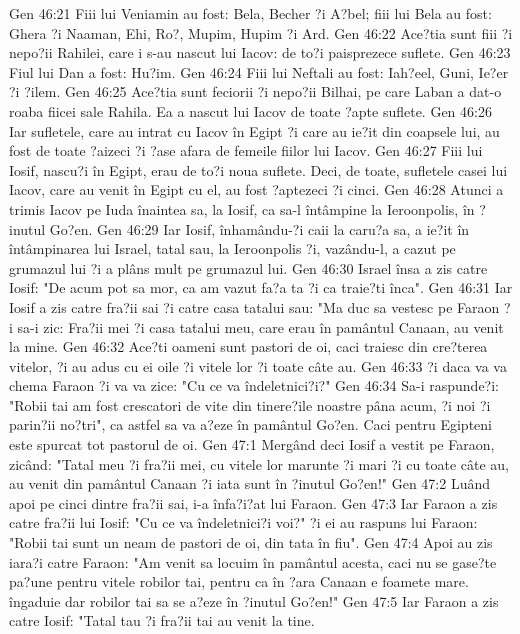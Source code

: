 Gen 46:21  Fiii lui Veniamin au fost: Bela, Becher ?i A?bel; fiii lui Bela au fost: Ghera ?i Naaman, Ehi, Ro?, Mupim, Hupim ?i Ard.
Gen 46:22  Ace?tia sunt fiii ?i nepo?ii Rahilei, care i s-au nascut lui Iacov: de to?i paisprezece suflete.
Gen 46:23  Fiul lui Dan a fost: Hu?im.
Gen 46:24  Fiii lui Neftali au fost: Iah?eel, Guni, Ie?er ?i ?ilem.
Gen 46:25  Ace?tia sunt feciorii ?i nepo?ii Bilhai, pe care Laban a dat-o roaba fiicei sale Rahila. Ea a nascut lui Iacov de toate ?apte suflete.
Gen 46:26  Iar sufletele, care au intrat cu Iacov în Egipt ?i care au ie?it din coapsele lui, au fost de toate ?aizeci ?i ?ase afara de femeile fiilor lui Iacov.
Gen 46:27  Fiii lui Iosif, nascu?i în Egipt, erau de to?i noua suflete. Deci, de toate, sufletele casei lui Iacov, care au venit în Egipt cu el, au fost ?aptezeci ?i cinci.
Gen 46:28  Atunci a trimis Iacov pe Iuda înaintea sa, la Iosif, ca sa-l întâmpine la Ieroonpolis, în ?inutul Go?en.
Gen 46:29  Iar Iosif, înhamându-?i caii la caru?a sa, a ie?it în întâmpinarea lui Israel, tatal sau, la Ieroonpolis ?i, vazându-l, a cazut pe grumazul lui ?i a plâns mult pe grumazul lui.
Gen 46:30  Israel însa a zis catre Iosif: "De acum pot sa mor, ca am vazut fa?a ta ?i ca traie?ti înca".
Gen 46:31  Iar Iosif a zis catre fra?ii sai ?i catre casa tatalui sau: "Ma duc sa vestesc pe Faraon ?i sa-i zic: Fra?ii mei ?i casa tatalui meu, care erau în pamântul Canaan, au venit la mine.
Gen 46:32  Ace?ti oameni sunt pastori de oi, caci traiesc din cre?terea vitelor, ?i au adus cu ei oile ?i vitele lor ?i toate câte au.
Gen 46:33  ?i daca va va chema Faraon ?i va va zice: "Cu ce va îndeletnici?i?"
Gen 46:34  Sa-i raspunde?i: "Robii tai am fost crescatori de vite din tinere?ile noastre pâna acum, ?i noi ?i parin?ii no?tri", ca astfel sa va a?eze în pamântul Go?en. Caci pentru Egipteni este spurcat tot pastorul de oi.
Gen 47:1  Mergând deci Iosif a vestit pe Faraon, zicând: "Tatal meu ?i fra?ii mei, cu vitele lor marunte ?i mari ?i cu toate câte au, au venit din pamântul Canaan ?i iata sunt în ?inutul Go?en!"
Gen 47:2  Luând apoi pe cinci dintre fra?ii sai, i-a înfa?i?at lui Faraon.
Gen 47:3  Iar Faraon a zis catre fra?ii lui Iosif: "Cu ce va îndeletnici?i voi?" ?i ei au raspuns lui Faraon: "Robii tai sunt un neam de pastori de oi, din tata în fiu".
Gen 47:4  Apoi au zis iara?i catre Faraon: "Am venit sa locuim în pamântul acesta, caci nu se gase?te pa?une pentru vitele robilor tai, pentru ca în ?ara Canaan e foamete mare. îngaduie dar robilor tai sa se a?eze în ?inutul Go?en!"
Gen 47:5  Iar Faraon a zis catre Iosif: "Tatal tau ?i fra?ii tai au venit la tine.
